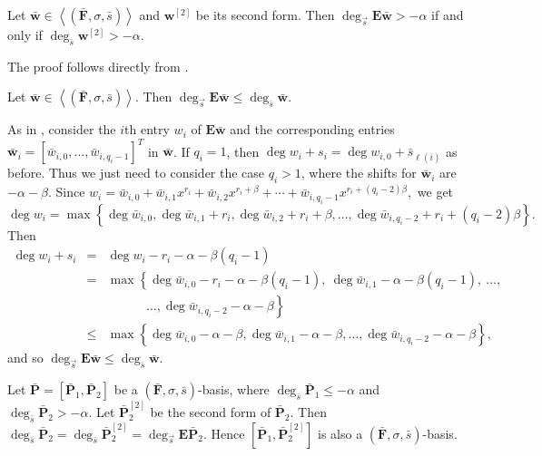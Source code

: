 \begin{cor}
\label{cor:degreeCorrespondence}Let $\bar{\mathbf{w}}\in\left\langle \left(\bar{\mathbf{F}},\sigma,\bar{s}\right)\right\rangle $
and $\mathbf{w}^{[2]}$ be its second form. Then $\deg_{\vec{s}}\mathbf{E}\bar{\mathbf{w}}>-\alpha$
if and only if $\deg_{\bar{s}}\mathbf{w}^{[2]}>-\alpha$.\end{cor}
\begin{pf}
The proof follows directly from .\end{pf}
\begin{lem}
\label{lem:degEwLessEqDegw}Let $\bar{\mathbf{w}}\in\left\langle \left(\bar{\mathbf{F}},\sigma,\bar{s}\right)\right\rangle $.
Then $\deg_{\vec{s}}\mathbf{E}\bar{\mathbf{w}}\le\deg_{\bar{s}}\bar{\mathbf{w}}$. \end{lem}
\begin{pf}
As in , consider the $i$th entry
$w_{i}$ of $\mathbf{E}\bar{\mathbf{w}}$ and the corresponding entries
$\bar{\mathbf{w}}_{i}=\left[\bar{w}_{i,0},\dots,\bar{w}_{i,q_{i}-1}\right]^{T}$
in $\bar{\mathbf{w}}$. If $q_{i}=1$, then $\deg w_{i}+s_{i}=\deg w_{i,0}+\bar{s}_{\ell(i)}$
as before. Thus we just need to consider the case $q_{i}>1$, where
the shifts for $\bar{\mathbf{w}}_{i}$ are $-\alpha-\beta$. Since
$w_{i}=\bar{w}_{i,0}+\bar{w}_{i,1}x^{r_{i}}+\bar{w}_{i,2}x^{r_{i}+\beta}+\cdots+\bar{w}_{i,q_{i}-1}x^{r_{i}+(q_{i}-2)\beta},$
we get \[
\deg w_{i}=\max\left\{ \deg\bar{w}_{i,0},\deg\bar{w}_{i,1}+r_{i},\deg\bar{w}_{i,2}+r_{i}+\beta,\dots,\deg\bar{w}_{i,q_{i}-2}+r_{i}+(q_{i}-2)\beta\right\} .\]
 Then \begin{eqnarray*}
\deg w_{i}+s_{i} & = & \deg w_{i}-r_{i}-\alpha-\beta(q_{i}-1)\\
 & = & \max\left\{ \deg\bar{w}_{i,0}-r_{i}-\alpha-\beta(q_{i}-1),~\deg\bar{w}_{i,1}-\alpha-\beta(q_{i}-1),~\dots,\right.\\
 &  & \left.~~~~~~~~~~~~~~\dots,\deg\bar{w}_{i,q_{i}-2}-\alpha-\beta\right\} \\
 & \le & \max\left\{ \deg\bar{w}_{i,0}-\alpha-\beta,\deg\bar{w}_{i,1}-\alpha-\beta,\dots,\deg\bar{w}_{i,q_{i}-2}-\alpha-\beta\right\} ,\end{eqnarray*}
 and so $\deg_{\vec{s}}\mathbf{E}\bar{\mathbf{w}}\le\deg_{\bar{s}}\bar{\mathbf{w}}$.\end{pf}
\begin{cor}
\label{cor:P2Degree}Let $\bar{\mathbf{P}}=[\bar{\mathbf{P}}_{1},\bar{\mathbf{P}}_{2}]$
be a $\left(\bar{\mathbf{F}},\sigma,\bar{s}\right)$-basis, where
$\deg_{\bar{s}}\bar{\mathbf{P}}_{1}\le-\alpha$ and $\deg_{\bar{s}}\bar{\mathbf{P}}_{2}>-\alpha$.
Let $\bar{\mathbf{P}}_{2}^{[2]}$ be the second form of $\bar{\mathbf{P}}_{2}$.
Then $\deg_{\bar{s}}\bar{\mathbf{P}}_{2}=\deg_{\bar{s}}\bar{\mathbf{P}}_{2}^{[2]}=\deg_{\vec{s}}\mathbf{E}\bar{\mathbf{P}}_{2}$.
Hence $[\bar{\mathbf{P}}_{1},\bar{\mathbf{P}}_{2}^{[2]}]$ is also
a $(\bar{\mathbf{F}},\sigma,\bar{s})$-basis.\end{cor}
